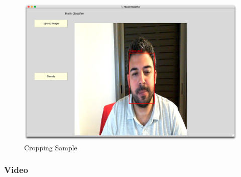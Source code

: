 \begin{figure}[H]
    \centering
    \includegraphics[width=1\textwidth]{images/Demo/Unmasked.png}
    \caption{Cropping Sample}
    \label{fig:UnMaskedAmir}
\end{figure}

\subsubsection{Video}
